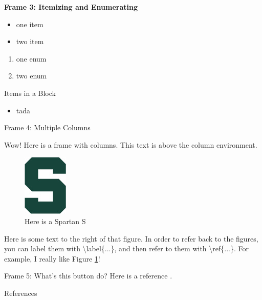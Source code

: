 \documentclass[aspectratio=169]{beamer}
\begin{document}
\begin{frame}{\bfseries Frame 3: Itemizing and Enumerating}

\begin{itemize}
\item one item
\item two item
\end{itemize}

\begin{enumerate}
\item one enum
\item two enum
\end{enumerate}

\begin{block}{Items in a Block}
\begin{itemize}
    \item tada
\end{itemize}
\end{block}

\end{frame}

\begin{frame}{Frame 4: Multiple Columns}
    \begin{alertblock}{Wow!}
        Here is a frame with columns. This text is above the column environment.
    \end{alertblock}

    
\begin{multicols}{2}
\begin{figure}[H]
\centering
\includegraphics[scale=.5]{spartans.jpg}
\caption{Here is a Spartan S}\label{fig:spartans}
\end{figure}
\columnbreak

Here is some text to the right of that figure. 
In order to refer back to the figures, you can label them with {\ttfamily \textbackslash label\{...\}}, and then refer to them with {\ttfamily \textbackslash ref\{...\}}.  For example, I really like Figure \ref{fig:spartans}!

\end{multicols}
\end{frame}

\begin{frame}{Frame 5: What's this button do?}
\label{back}
    \hyperlink{outline}{}
    Here is a reference \cite{cite1}.
\end{frame}
\begin{frame}{References}
    
    
\end{frame}


\end{document}
